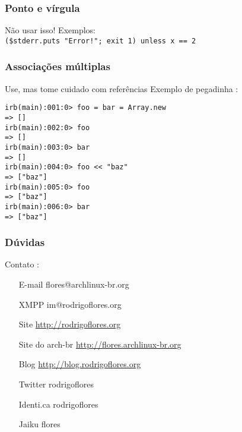 \documentclass{beamer}
\begin{document}
\begin{frame}[fragile]
    \frametitle{Ponto e vírgula}
    \begin{block}{Não usar isso!}
        Exemplos:\\
        \verb#($stderr.puts "Error!"; exit 1) unless x == 2#
    \end{block}
\end{frame}

\begin{frame}[fragile]
    \frametitle{Associações múltiplas}
    \begin{block}{Use, mas tome cuidado com referências}
        Exemplo de pegadinha :\\
        \begin{verbatim}
irb(main):001:0> foo = bar = Array.new
=> []
irb(main):002:0> foo
=> []
irb(main):003:0> bar
=> []
irb(main):004:0> foo << "baz"
=> ["baz"]
irb(main):005:0> foo
=> ["baz"]
irb(main):006:0> bar
=> ["baz"]
        \end{verbatim}
    \end{block}
\end{frame}







\begin{frame}
    \frametitle{Dúvidas}
    \begin{block}{Contato :}
        \begin{itemize}
            \centering
            \item[E-mail] flores@archlinux-br.org        
            \item[XMPP]  im@rodrigoflores.org        
            \item[Site]  \url{http://rodrigoflores.org}
            \item[Site do arch-br]  \url{http://flores.archlinux-br.org}
            \item[Blog]  \url{http://blog.rodrigoflores.org}        
            \item[Twitter] rodrigoflores        
            \item[Identi.ca] rodrigoflores        
            \item[Jaiku] flores        
        \end{itemize}
    \end{block}

\end{frame}
\end{document}
